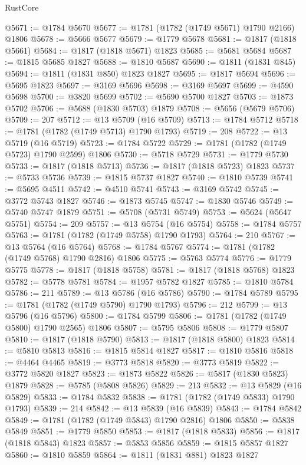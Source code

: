 \begin{lexlean}{RustCore}
\begin{coremodule}
@5671 := @1784 @5670
@5677 := @1781 (@1782 (@1749 @5671) @1790 @2166) @1806
@5678 := @5666 @5677
@5679 := @1779 @5678
@5681 := @1817 (@1818 @5661)
@5684 := @1817 (@1818 @5671) @1823
@5685 := @5681 @5684
@5687 := @1815 @5685 @1827
@5688 := @1810 @5687
@5690 := @1811 (@1831 @845)
@5694 := @1811 (@1831 @850) @1823 @1827
@5695 := @1817 @5694
@5696 := @5695 @1823
@5697 := @3169 @5696
@5698 := @3169 @5697
@5699 := @4590 @5698
@5700 := @3820 @5699
@5702 := @5690 @5700 @1827
@5703 := @1873 @5702
@5706 := @5688 (@1830 @5703) @1879
@5708 := @5656 (@5679 @5706)
@5709 := 207
@5712 := @13 @5709 (@16 @5709)
@5713 := @1784 @5712
@5718 := @1781 (@1782 (@1749 @5713) @1790 @1793)
@5719 := 208
@5722 := @13 @5719 (@16 @5719)
@5723 := @1784 @5722
@5729 := @1781 (@1782 (@1749 @5723) @1790 @2599) @1806
@5730 := @5718 @5729
@5731 := @1779 @5730
@5733 := @1817 (@1818 @5713)
@5736 := @1817 (@1818 @5723) @1823
@5737 := @5733 @5736
@5739 := @1815 @5737 @1827
@5740 := @1810 @5739
@5741 := @5695 @4511
@5742 := @4510 @5741
@5743 := @3169 @5742
@5745 := @3772 @5743 @1827
@5746 := @1873 @5745
@5747 := @1830 @5746
@5749 := @5740 @5747 @1879
@5751 := @5708 (@5731 @5749)
@5753 := @5624 (@5647 @5751)
@5754 := 209
@5757 := @13 @5754 (@16 @5754)
@5758 := @1784 @5757
@5763 := @1781 (@1782 (@1749 @5758) @1790 @1793)
@5764 := 210
@5767 := @13 @5764 (@16 @5764)
@5768 := @1784 @5767
@5774 := @1781 (@1782 (@1749 @5768) @1790 @2816) @1806
@5775 := @5763 @5774
@5776 := @1779 @5775
@5778 := @1817 (@1818 @5758)
@5781 := @1817 (@1818 @5768) @1823
@5782 := @5778 @5781
@5784 := @1957 @5782 @1827
@5785 := @1810 @5784
@5786 := 211
@5789 := @13 @5786 (@16 @5786)
@5790 := @1784 @5789
@5795 := @1781 (@1782 (@1749 @5790) @1790 @1793)
@5796 := 212
@5799 := @13 @5796 (@16 @5796)
@5800 := @1784 @5799
@5806 := @1781 (@1782 (@1749 @5800) @1790 @2565) @1806
@5807 := @5795 @5806
@5808 := @1779 @5807
@5810 := @1817 (@1818 @5790)
@5813 := @1817 (@1818 @5800) @1823
@5814 := @5810 @5813
@5816 := @1815 @5814 @1827
@5817 := @1810 @5816
@5818 := @4464 @4465
@5819 := @3773 @5818
@5820 := @3773 @5819
@5822 := @3772 @5820 @1827
@5823 := @1873 @5822
@5826 := @5817 (@1830 @5823) @1879
@5828 := @5785 (@5808 @5826)
@5829 := 213
@5832 := @13 @5829 (@16 @5829)
@5833 := @1784 @5832
@5838 := @1781 (@1782 (@1749 @5833) @1790 @1793)
@5839 := 214
@5842 := @13 @5839 (@16 @5839)
@5843 := @1784 @5842
@5849 := @1781 (@1782 (@1749 @5843) @1790 @2816) @1806
@5850 := @5838 @5849
@5851 := @1779 @5850
@5853 := @1817 (@1818 @5833)
@5856 := @1817 (@1818 @5843) @1823
@5857 := @5853 @5856
@5859 := @1815 @5857 @1827
@5860 := @1810 @5859
@5864 := @1811 (@1831 @881) @1823 @1827

\end{coremodule}
\end{lexlean}
